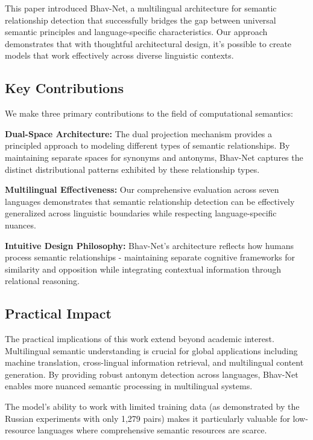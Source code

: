 \documentclass[11pt]{article}
\begin{document}
This paper introduced Bhav-Net, a multilingual architecture for semantic relationship detection that successfully bridges the gap between universal semantic principles and language-specific characteristics. Our approach demonstrates that with thoughtful architectural design, it's possible to create models that work effectively across diverse linguistic contexts.

\subsection{Key Contributions}

We make three primary contributions to the field of computational semantics:

\textbf{Dual-Space Architecture:} The dual projection mechanism provides a principled approach to modeling different types of semantic relationships. By maintaining separate spaces for synonyms and antonyms, Bhav-Net captures the distinct distributional patterns exhibited by these relationship types.

\textbf{Multilingual Effectiveness:} Our comprehensive evaluation across seven languages demonstrates that semantic relationship detection can be effectively generalized across linguistic boundaries while respecting language-specific nuances.

\textbf{Intuitive Design Philosophy:} Bhav-Net's architecture reflects how humans process semantic relationships - maintaining separate cognitive frameworks for similarity and opposition while integrating contextual information through relational reasoning.

\subsection{Practical Impact}

The practical implications of this work extend beyond academic interest. Multilingual semantic understanding is crucial for global applications including machine translation, cross-lingual information retrieval, and multilingual content generation. By providing robust antonym detection across languages, Bhav-Net enables more nuanced semantic processing in multilingual systems.

The model's ability to work with limited training data (as demonstrated by the Russian experiments with only 1,279 pairs) makes it particularly valuable for low-resource languages where comprehensive semantic resources are scarce.
\end{document}
